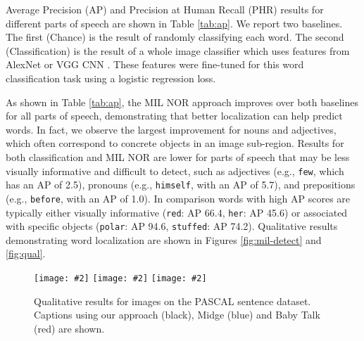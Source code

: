 \documentclass[10pt,twocolumn,letterpaper]{article}
\newcommand{\insertH}[2]{\texttt{[image: \#2]}}
\begin{document}
Average Precision (AP) and Precision at Human Recall (PHR) \cite{capeval2015} results for different parts of speech are shown in Table \ref{tab:ap}. We report two baselines. The first (Chance) is the result of randomly classifying each word. The second (Classification) is the result of a whole image classifier which uses features from AlexNet or VGG CNN \cite{krizhevskyNIPS12,simonyan14very}. These features were fine-tuned for this word classification task using a logistic regression loss.

As shown in Table \ref{tab:ap}, the MIL NOR approach improves over both baselines for all parts of speech, demonstrating that better localization can help predict words. In fact, we observe the largest improvement for nouns and adjectives, which often correspond to concrete objects in an image sub-region.  Results for both classification and MIL NOR are lower for parts of speech that may be less visually informative and difficult to detect, such as adjectives (e.g., \texttt{few}, which has an AP of 2.5), pronouns (e.g., \texttt{himself}, with an AP of 5.7), and prepositions (e.g., \texttt{before}, with an AP of 1.0). In comparison words with high AP scores are typically either visually informative (\texttt{red}: AP 66.4, \texttt{her}: AP 45.6) or associated with specific objects (\texttt{polar}: AP 94.6, \texttt{stuffed}: AP 74.2). Qualitative results demonstrating word localization are shown in Figures \ref{fig:mil-detect} and \ref{fig:qual}.

\begin{figure}\centering
 \insertH{0.145}{figures/pascal_2008_003819.jpg}
 \insertH{0.145}{figures/pascal_2008_004214.jpg}
 \insertH{0.145}{figures/pascal_2008_001155.jpg}
\caption{Qualitative results for images on the PASCAL sentence dataset. Captions using our approach (black), Midge \cite{mitchell2012midge} (blue) and Baby Talk \cite{kulkarni2011baby} (red) are shown.}
\label{fig:PASCAL}
\vspace{-1em}
\end{figure}
\end{document}
